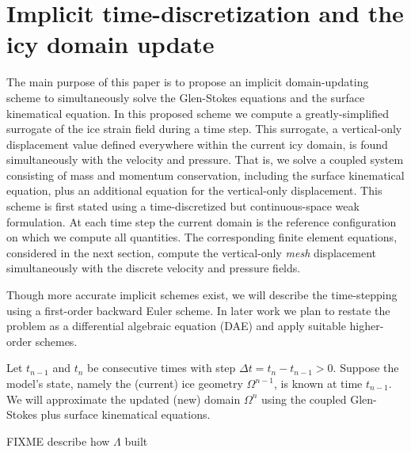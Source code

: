 \documentclass[letterpaper,final,12pt,reqno]{amsart}
\begin{document}
\section{Implicit time-discretization and the icy domain update} \label{sec:implicitstep}

The main purpose of this paper is to propose an implicit domain-updating scheme to simultaneously solve the Glen-Stokes equations and the surface kinematical equation.  In this proposed scheme we compute a greatly-simplified surrogate of the ice strain field during a time step.  This surrogate, a vertical-only displacement value defined everywhere within the current icy domain, is found simultaneously with the velocity and pressure.  That is, we solve a coupled system consisting of mass and momentum conservation, including the surface kinematical equation, plus an additional equation for the vertical-only displacement.  This scheme is first stated using a time-discretized but continuous-space weak formulation.  At each time step the current domain is the reference configuration on which we compute all quantities.  The corresponding finite element equations, considered in the next section, compute the vertical-only \emph{mesh} displacement simultaneously with the discrete velocity and pressure fields.

Though more accurate implicit schemes exist, we will describe the time-stepping using a first-order backward Euler scheme.  In later work we plan to restate the problem as a differential algebraic equation (DAE) and apply suitable higher-order schemes.

Let $t_{n-1}$ and $t_n$ be consecutive times with step $\Delta t = t_n - t_{n-1} > 0$.  Suppose the model's state, namely the (current) ice geometry $\Omega^{n-1}$, is known at time $t_{n-1}$.  We will approximate the updated (new) domain $\Omega^n$ using the coupled Glen-Stokes plus surface kinematical equations.

FIXME describe how $\Lambda$ built
\end{document}
